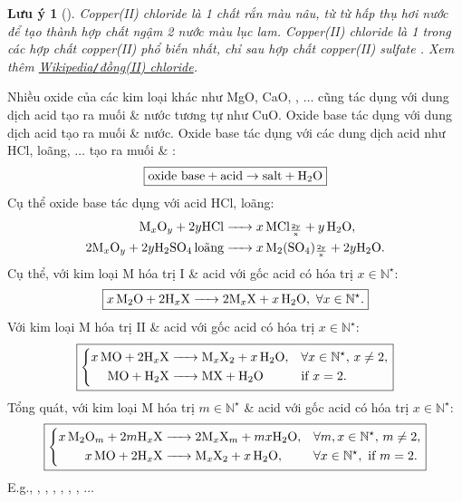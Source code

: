 \documentclass{article}
\newtheorem{luuy}{Lưu ý}
\begin{document}
\begin{luuy}[]
	Copper(II) chloride {\rm{}} là 1 chất rắn màu nâu, từ từ hấp thụ hơi nước để tạo thành hợp chất ngậm 2 nước màu lục lam. Copper(II) chloride là 1 trong các hợp chất copper(II) phổ biến nhất, chỉ sau hợp chất copper(II) sulfate {\rm{}}. Xem thêm \href{https://vi.wikipedia.org/wiki/%C4%90%E1%BB%93ng(II)_chloride}{Wikipedia{\tt/}đồng(II) chloride}.
\end{luuy}
Nhiều oxide của các kim loại khác như MgO, CaO, , $\ldots$ cũng tác dụng với dung dịch acid tạo ra muối \& nước tương tự như CuO. Oxide base tác dụng với dung dịch acid tạo ra muối \& nước. Oxide base tác dụng với các dung dịch acid như HCl,  loãng, $\ldots$ tạo ra muối \& :
\begin{align*}
	\boxed{\mbox{oxide base} + \mbox{acid}\to\mbox{salt} + \ce{H2O}}
\end{align*}
Cụ thể oxide base tác dụng với acid HCl,  loãng:
\begin{align*}
	\ce{M_xO_y + $2y$HCl &-> $x$MCl_{\frac{2y}{x}} + $y$H2O},\\
	\ce{$2$M_xO_y + $2y$H2SO4 \mbox{loãng} &-> $x$M2(SO4)_{\frac{2y}{x}} + $2y$H2O}.
\end{align*}
Cụ thể, với kim loại M hóa trị I \& acid  với gốc acid  có hóa trị $x\in\mathbb{N}^\star$:
\begin{align*}
	\boxed{\ce{$x$M2O + $2$H_xX -> $2$M_xX + $x$H2O},\ \forall x\in\mathbb{N}^\star.}
\end{align*}
Với kim loại M hóa trị II \& acid  với gốc acid  có hóa trị $x\in\mathbb{N}^\star$:
\begin{equation*}
	\boxed{\left\{\begin{split}
			\ce{$x$MO + $2$H_xX &-> M_xX2 + $x$H2O},&&\forall x\in\mathbb{N}^\star,\,x\ne2,\\
			\ce{MO + H2X &-> MX + H2O}&&\mbox{if } x = 2.
		\end{split}\right.}
\end{equation*}
Tổng quát, với kim loại M hóa trị $m\in\mathbb{N}^\star$ \& acid  với gốc acid  có hóa trị $x\in\mathbb{N}^\star$:
\begin{equation*}
	\boxed{\left\{\begin{split}
			\ce{$x$M2O_m + $2m$H_xX &-> $2$M_xX_m + $mx$H2O},&&\forall m,x\in\mathbb{N}^\star,\,m\ne2,\\
			\ce{$x$MO + $2$H_xX &-> M_xX2 + $x$H2O},&&\forall x\in\mathbb{N}^\star,\mbox{ if } m = 2.
		\end{split}\right.}
\end{equation*}
E.g., , , , , , , $\ldots$
\end{document}
